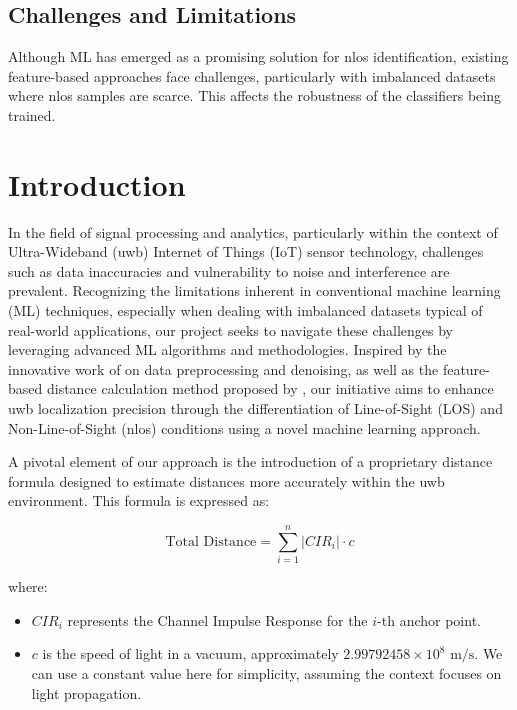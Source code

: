 \subsection{Challenges and Limitations}\label{Challenges and Limitations}
Although ML has emerged as a promising solution for \gls{nlos} identification, existing feature-based approaches face challenges, particularly with imbalanced datasets where \gls{nlos} samples are scarce. This affects the robustness of the classifiers being trained.


\section{Introduction}\label{introduction}
In the field of signal processing and analytics, particularly within the context of Ultra-Wideband (\gls{uwb}) Internet of Things (IoT) sensor technology, challenges such as data inaccuracies and vulnerability to noise and interference are prevalent. Recognizing the limitations inherent in conventional machine learning (ML) techniques, especially when dealing with imbalanced datasets typical of real-world applications, our project seeks to navigate these challenges by leveraging advanced ML algorithms and methodologies. Inspired by the innovative work of \cite{jiang_uwb_2020} on data preprocessing and denoising, as well as the feature-based distance calculation method proposed by \cite{che_feature-based_2022}, our initiative aims to enhance \gls{uwb} localization precision through the differentiation of Line-of-Sight (LOS) and Non-Line-of-Sight (\gls{nlos}) conditions using a novel machine learning approach.

A pivotal element of our approach is the introduction of a proprietary distance formula designed to estimate distances more accurately within the \gls{uwb} environment. This formula is expressed as:

\begin{equation}
\text{Total Distance} = \sum_{i=1}^{n} |CIR_i| \cdot c
\end{equation}

where:

\begin{itemize}
  \item $CIR_i$ represents the Channel Impulse Response for the $i$-th anchor point.
  \item $c$ is the speed of light in a vacuum, approximately $2.99792458 \times 10^8 \text{ m/s}$. We can use a constant value here for simplicity, assuming the context focuses on light propagation.
\end{itemize}

